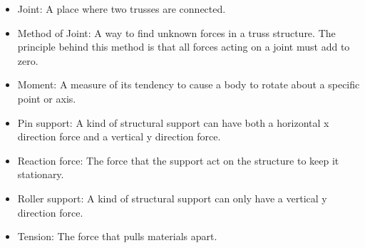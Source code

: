 \documentclass[12pt]{article}
\begin{document}
\begin{itemize}
	
	\item Joint: A place where two trusses are connected.
	
\end{itemize}

\begin{itemize}
	
	\item Method of Joint: A way to find unknown forces in a truss structure. 
	The principle behind this method is that all forces acting on a joint must 
	add to zero.
	
\end{itemize}

\begin{itemize}
	
	\item Moment: A measure of its tendency to cause a body to rotate about a 
	specific point or axis. 
	
\end{itemize}

\begin{itemize}

\item Pin support: A kind of structural support can have both a horizontal x 
direction force and a vertical y direction force.

\end{itemize}

\begin{itemize}
	
	\item Reaction force: The force that the support act on the structure to 
	keep it stationary.
	
\end{itemize}

\begin{itemize}
	
	\item Roller support: A kind of structural support can only have a 
	vertical y direction force.
	
\end{itemize}

\begin{itemize}
	
	\item Tension: The force that pulls materials apart.
	
\end{itemize}
\end{document}

